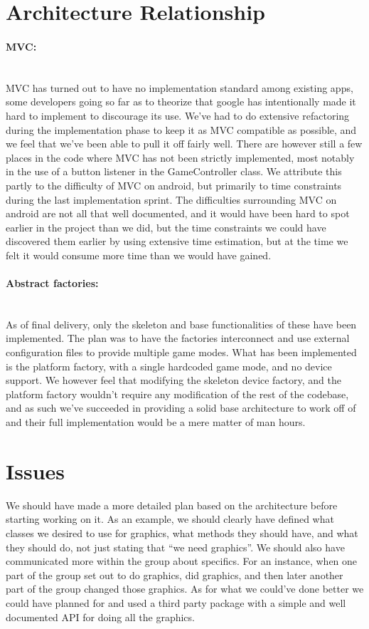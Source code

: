 \documentclass[12pt, a4paper]{article}
\begin{document}
\section{Architecture Relationship}
\paragraph{MVC:}~\\
MVC has turned out to have no implementation standard among existing apps, some
developers going so far as to theorize that google has intentionally made it
hard to implement to discourage its use. We’ve had to do extensive refactoring
during the implementation phase to keep it as MVC compatible as possible, and we
feel that we’ve been able to pull it off fairly well. There are however still a
few places in the code where MVC has not been strictly implemented, most notably
in the use of a button listener in the GameController class. We attribute this
partly to the difficulty of MVC on android, but primarily to time constraints
during the last implementation sprint.
The difficulties surrounding MVC on android are not all that well documented,
and it would have been hard to spot earlier in the project than we did, but the
time constraints we could have discovered them earlier by using extensive time
estimation, but at the time we felt it would consume more time than we would
have gained.

\paragraph{Abstract factories:}~\\
As of final delivery, only the skeleton and base functionalities of these have
been implemented.
The plan was to have the factories interconnect and use external configuration
files to provide multiple game modes. What has been implemented is the platform
factory, with a single hardcoded game mode, and no device support.
We however feel that modifying the skeleton device factory, and the platform
factory wouldn’t require any modification of the rest of the codebase, and as
such we’ve succeeded in providing a solid base architecture to work off of and
their full implementation would be a mere matter of man hours.

\section{Issues}
We should have made a more detailed plan based on the architecture before
starting working on it. As an example, we should clearly have defined what
classes we desired to use for graphics, what methods they should have, and what
they should do, not just stating that “we need graphics”.
We should also have communicated more within the group about specifics. For an
instance, when one part of the group set out to do graphics, did graphics, and
then later another part of the group changed those graphics.
As for what we could’ve done better we could have planned for and used a third
party package with a simple and well documented API for doing all the graphics. 
\end{document}
